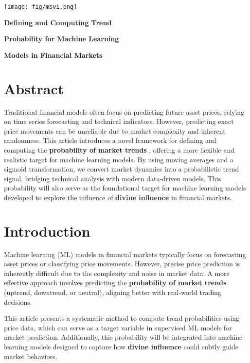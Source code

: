 \documentclass[a4]{article}
\newcommand{\bn}{\bigskip\noindent}
\newcommand{\mn}{\medskip\noindent}
\begin{document}
\begin{center}
\texttt{[image: fig/msvi.png]}
\end{center}

\mn
{\huge\bf Defining and Computing Trend}

\mn
{\huge\bf  Probability for Machine Learning}

\mn
{\huge\bf   Models in Financial Markets}



\bn
\section*{Abstract}

\bn

Traditional financial models often focus on predicting future asset prices, relying on time series forecasting and technical indicators. However, predicting exact price movements can be unreliable due to market complexity and inherent randomness. This article introduces a novel framework for defining and computing the {\bf probability of market trends} , offering a more flexible and realistic target for machine learning models. By using moving averages and a sigmoid transformation, we convert market dynamics into a probabilistic trend signal, bridging technical analysis with modern data-driven models. This probability will also serve as the foundational target for machine learning models developed to explore the influence of {\bf divine influence}  in financial markets.


\bn
\section{Introduction}

Machine learning (ML) models in financial markets typically focus on forecasting asset prices or classifying price movements. However, precise price prediction is inherently difficult due to the complexity and noise in market data. A more effective approach involves predicting the {\bf probability of market trends}  (uptrend, downtrend, or neutral), aligning better with real-world trading decisions.

\bn
This article presents a systematic method to compute trend probabilities using price data, which can serve as a target variable in supervised ML models for market prediction. Additionally, this probability will be integrated into machine learning models designed to capture how {\bf divine influence}  could subtly guide market behaviors.
\end{document}
